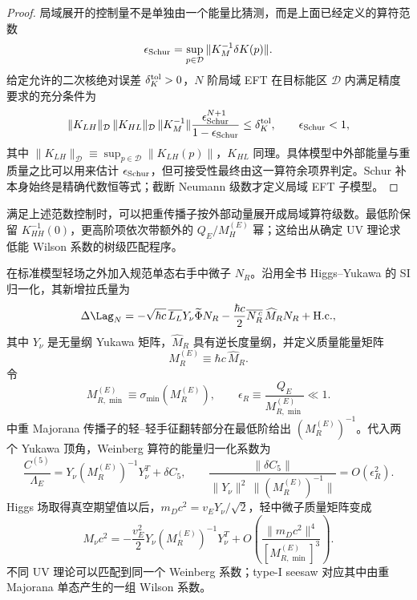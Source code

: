 \begin{proof}
局域展开的控制量不是单独由一个能量比猜测，而是上面已经定义的算符范数
\begin{equation*}
 \epsilon_{\rm Schur}=\sup_{p\in\mathcal D}\|K_M^{-1}\delta K(p)\|.
\end{equation*}
给定允许的二次核绝对误差 $\delta_K^{\rm tol}>0$，$N$ 阶局域 EFT 在目标能区 $\mathcal D$ 内满足精度要求的充分条件为
\begin{equation*}
 \|K_{LH}\|_{\mathcal D}\,\|K_{HL}\|_{\mathcal D}\,
 \|K_M^{-1}\|
 \frac{\epsilon_{\rm Schur}^{N+1}}{1-\epsilon_{\rm Schur}}
 \le \delta_K^{\rm tol},
 \qquad \epsilon_{\rm Schur}<1,
\end{equation*}
其中 $\|K_{LH}\|_{\mathcal D}\equiv\sup_{p\in\mathcal D}\|K_{LH}(p)\|$，$K_{HL}$ 同理。具体模型中外部能量与重质量之比可以用来估计 $\epsilon_{\rm Schur}$，但可接受性最终由这一算符余项界判定。Schur 补本身始终是精确代数恒等式；截断 Neumann 级数才定义局域 EFT 子模型。
\end{proof}

满足上述范数控制时，可以把重传播子按外部动量展开成局域算符级数。最低阶保留 $K_{HH}^{-1}(0)$，更高阶项依次带额外的 $Q_E/M_H^{(E)}$ 幂；这给出从确定 UV 理论求低能 Wilson 系数的树级匹配程序。

\begin{exbox}
在标准模型轻场之外加入规范单态右手中微子 $N_R$。沿用全书 Higgs--Yukawa 的 SI 归一化，其新增拉氏量为
\begin{equation*}
 \Delta\Lag_N
 =-\sqrt{\hbar c}\,\overline{L_L}Y_\nu\widetilde\Phi N_R
 -\frac{\hbar c}{2}\overline{N_R^{\,c}}\,\widehat M_R N_R
 +\mathrm{H.c.},
\end{equation*}
其中 $Y_\nu$ 是无量纲 Yukawa 矩阵，$\widehat M_R$ 具有逆长度量纲，并定义质量能量矩阵
\begin{equation*}
 M_R^{(E)}\equiv\hbar c\,\widehat M_R.
\end{equation*}
令
\begin{equation*}
 M_{R,\min}^{(E)}\equiv\sigma_{\min}(M_R^{(E)}),
 \qquad
 \epsilon_R\equiv\frac{Q_E}{M_{R,\min}^{(E)}}\ll1.
\end{equation*}
 中重 Majorana 传播子的轻--轻手征翻转部分在最低阶给出 $(M_R^{(E)})^{-1}$。代入两个 Yukawa 顶角，Weinberg 算符的能量归一化系数为
\begin{equation}
 \boxed{
 \frac{C^{(5)}}{\Lambda_E}
 =Y_\nu(M_R^{(E)})^{-1}Y_\nu^T+\delta C_5,
 \qquad
 \frac{\|\delta C_5\|}
 {\|Y_\nu\|^2\,\|(M_R^{(E)})^{-1}\|}
 =O(\epsilon_R^2).}
 \label{eq:typeI-weinberg-matching-dp86}
\end{equation}
Higgs 场取得真空期望值以后，$m_Dc^2=v_EY_\nu/\sqrt2$，轻中微子质量矩阵变成
\begin{equation}
 \boxed{
 M_\nu c^2
 =-\frac{v_E^2}{2}
 Y_\nu(M_R^{(E)})^{-1}Y_\nu^T
 +O\!\left(\frac{\|m_Dc^2\|^4}{[M_{R,\min}^{(E)}]^3}\right).}
 \label{eq:typeI-seesaw-mass-dp86}
\end{equation}
不同 UV 理论可以匹配到同一个 Weinberg 系数；type-I seesaw 对应其中由重 Majorana 单态产生的一组 Wilson 系数。
\end{exbox}
